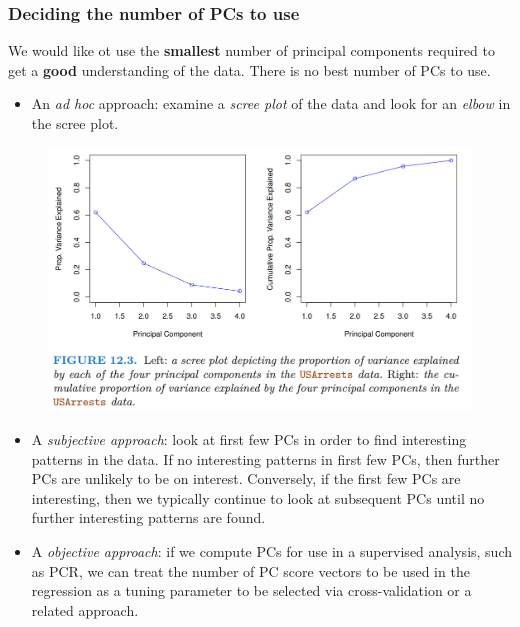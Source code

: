 \documentclass[11pt]{article}
\begin{document}
\subsubsection*{Deciding the number of PCs to use}
\noindent We would like ot use the \textbf{smallest} number of principal components required to get a \textbf{good} understanding of the data. There is no best number of PCs to use.
\begin{itemize}
    \item An \textit{ad hoc} approach: examine a \textit{scree plot} of the data and look for an \textit{elbow} in the scree plot.
\end{itemize}
\begin{figure}[H]
    \centering
    \includegraphics[width=0.7\linewidth]{Unsupervised - USArrests - Scree Plot.png}
\end{figure}
\begin{itemize}
    \item A \textit{subjective approach}: look at first few PCs in order to find interesting patterns in the data. If no interesting patterns in first few PCs, then further PCs are unlikely to be on interest. Conversely, if the first few PCs are interesting, then we typically continue to look at subsequent PCs until no further interesting patterns are found.
    \item A \textit{objective approach}: if we compute PCs for use in a supervised analysis, such as PCR, we can treat the number of PC score vectors to be used in the regression as a tuning parameter to be selected via cross-validation or a related approach.
\end{itemize}
\end{document}
